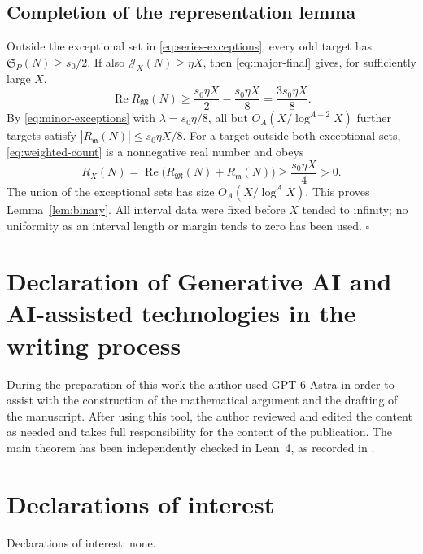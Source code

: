 \documentclass[11pt,letterpaper]{article}
\numberwithin{equation}{section}
\theoremstyle{remark}
\begin{document}
\subsection{Completion of the representation lemma}

Outside the exceptional set in \eqref{eq:series-exceptions}, every
odd target has $\mathfrak S_P(N)\ge s_0/2$. If also
$\mathcal J_X(N)\ge\eta X$, then \eqref{eq:major-final} gives,
for sufficiently large $X$,
\[
 \operatorname{Re}R_{\mathfrak M}(N)
 \ge\frac{s_0\eta X}{2}-\frac{s_0\eta X}{8}
 =\frac{3s_0\eta X}{8}.
\]
By \eqref{eq:minor-exceptions} with $\lambda=s_0\eta/8$,
all but $O_A(X/\log^{A+2}X)$ further targets satisfy
$|R_{\mathfrak m}(N)|\le s_0\eta X/8$. For a target outside
both exceptional sets, \eqref{eq:weighted-count} is a nonnegative
real number and obeys
\[
 R_X(N)=\operatorname{Re}
             \bigl(R_{\mathfrak M}(N)+R_{\mathfrak m}(N)\bigr)
 \ge\frac{s_0\eta X}{4}>0.
\]
The union of the exceptional sets has size $O_A(X/\log^A X)$.
This proves Lemma~\ref{lem:binary}. All interval data were fixed
before $X$ tended to infinity; no uniformity as an interval length
or margin tends to zero has been used. \hfill$\square$

\section*{Declaration of Generative AI and AI-assisted technologies in the writing process}
During the preparation of this work the author used GPT-6 Astra in order to assist with the construction of the mathematical argument and the drafting of the manuscript. After using this tool, the author reviewed and edited the content as needed and takes full responsibility for the content of the publication. The main theorem has been independently checked in Lean~4, as recorded in \cite{Github}.

\section*{Declarations of interest}
Declarations of interest: none.
\end{document}
